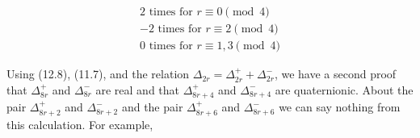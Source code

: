 $$\begin{array}{l}
2 \text{ times for } r \equiv 0 \pmod{4} \\
-2 \text{ times for } r \equiv 2 \pmod{4} \\
0 \text{ times for } r \equiv 1, 3 \pmod{4}
\end{array}$$

Using (12.8), (11.7), and the relation $\Delta_{2r} = \Delta_{2r}^+ + \Delta_{2r}^-$, we have a second proof that $\Delta_{8r}^+$ and $\Delta_{8r}^-$ are real and that $\Delta_{8r+4}^+$ and $\Delta_{8r+4}^-$ are quaternionic. About the pair $\Delta_{8r+2}^+$ and $\Delta_{8r+2}^-$ and the pair $\Delta_{8r+6}^+$ and $\Delta_{8r+6}^-$ we can say nothing from this calculation. For example,
